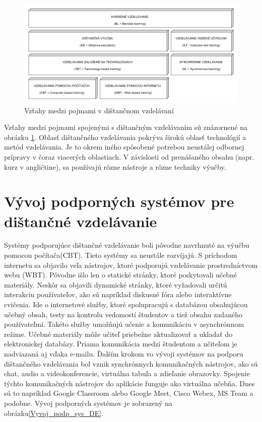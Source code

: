 \documentclass[10pt,oneside,slovak,a4paper]{article}
\begin{document}
\begin{figure}[h]
	\centering
	\includegraphics[width=\textwidth]{Vztahy_DE.png}
	\caption{Vzťahy medzi pojmami v dištančnom vzdelávaní\cite{WiktorzakKotowski}}
	\label{Vztahy_medzi_pojmami}
\end{figure}

Vzťahy medzi pojmami spojenými s dištančným vzdelávaním sú znázornené na obrázku \ref{Vztahy_medzi_pojmami}.
Oblasť dištančného vzdelávania pokrýva širokú oblasť technológií a metód vzdelávania.
Je to okrem iného spôsobené potrebou neustálej odbornej prípravy v čoraz viacerých oblastiach.
V závislosti od prenášaného obsahu (napr. kurz v angličtine), sa používajú rôzne nástroje a rôzne techniky výučby.

\section{Vývoj podporných systémov pre dištančné vzdelávanie}%
\label{Vyvojsys}
Systémy podporujúce dištančné vzdelávanie boli pôvodne navrhnuté na výučbu pomocou počítača(CBT)\cite{WiktorzakKotowski}.
Tieto systémy sa neustále rozvíjajú.
S príchodom internetu sa objavilo veľa nástrojov, ktoré podporujú vzdelávanie prostredníctvom webu (WBT).
Pôvodne išlo len o statické stránky, ktoré poskytovali učebné materiály.
Neskôr sa objavili dynamické stránky, ktoré vyžadovali určitú interakciu používateľov, ako sú napríklad diskusné fóra alebo interaktívne cvičenia.
Ide o internetové služby, ktoré spolupracujú s databázou obsahujúcou učebný obsah, testy na kontrolu vedomostí študentov a tiež obsahu zadaného používateľmi.
Takéto služby umožňujú učenie a komunikáciu v asynchrónnom režime. Učebné materiály môže učiteľ priebežne aktualizovať a ukladať do elektronickej databázy.
Priama komunikácia medzi študentom a učiteľom je nadviazaná aj vďaka e-mailu.
Ďalším krokom vo vývoji systémov na podporu dištančného vzdelávania bol vznik synchrónnych komunikačných nástrojov, ako sú chat, audio a videokonferencie, virtuálna tabuľa a zdieľanie obrazovky.
Spojenie týchto komunikačných nástrojov do aplikácie funguje ako virtuálna učebňa.
Dnes sú to napríklad Google Classroom alebo Google Meet, Cisco Webex, MS Team a podobne.
Vývoj podporných systémov je zobrazený na obrázku\ref{Vyvoj_podp_sys_DE}.
\end{document}
